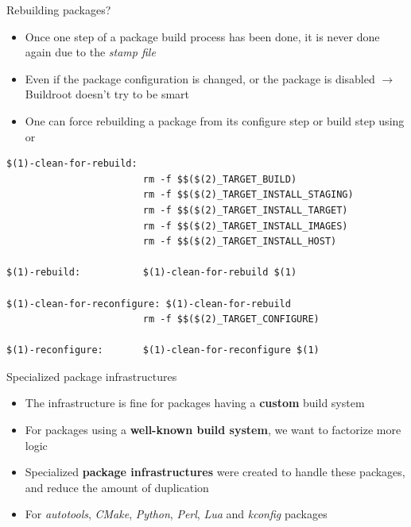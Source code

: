 \begin{frame}[fragile]{Rebuilding packages?}
  \begin{itemize}
  \item Once one step of a package build process has been done, it is
    never done again due to the {\em stamp file}
  \item Even if the package configuration is changed, or the package
    is disabled $\rightarrow$ Buildroot doesn't try to be smart
  \item One can force rebuilding a package from its configure step or
    build step using  or 
  \end{itemize}
  \begin{block}{}
    \begin{verbatim}
$(1)-clean-for-rebuild:
                        rm -f $$($(2)_TARGET_BUILD)
                        rm -f $$($(2)_TARGET_INSTALL_STAGING)
                        rm -f $$($(2)_TARGET_INSTALL_TARGET)
                        rm -f $$($(2)_TARGET_INSTALL_IMAGES)
                        rm -f $$($(2)_TARGET_INSTALL_HOST)

$(1)-rebuild:           $(1)-clean-for-rebuild $(1)

$(1)-clean-for-reconfigure: $(1)-clean-for-rebuild
                        rm -f $$($(2)_TARGET_CONFIGURE)

$(1)-reconfigure:       $(1)-clean-for-reconfigure $(1)
\end{verbatim}
\end{block}
\end{frame}

\begin{frame}{Specialized package infrastructures}
  \begin{itemize}
  \item The  infrastructure is fine for packages
    having a {\bf custom} build system
  \item For packages using a {\bf well-known build system}, we want
    to factorize more logic
  \item Specialized {\bf package infrastructures} were created to
    handle these packages, and reduce the amount of duplication
  \item For {\em autotools}, {\em CMake}, {\em Python}, {\em Perl},
    {\em Lua} and {\em kconfig} packages
  \end{itemize}
\end{frame}

